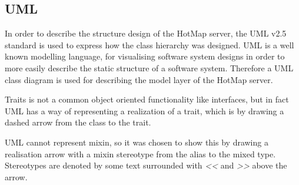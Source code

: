 \subsection{UML}
In order to describe the structure design of the HotMap server, the UML v2.5 standard is used to express how the class hierarchy was designed. UML is a well known modelling language, for visualising software system designs in order to more easily describe the static structure of a software system. Therefore a UML class diagram is used for describing the model layer of the HotMap server.

Traits is not a common object oriented functionality like interfaces, but in fact UML has a way of representing a realization of a trait, which is by drawing a dashed arrow from the class to the trait.

UML cannot represent mixin, so it was chosen to show this by drawing a realisation arrow with a mixin stereotype from the alias to the mixed type. Stereotypes are denoted by some text surrounded with \emph{<<} and \emph{>>} above the arrow.


